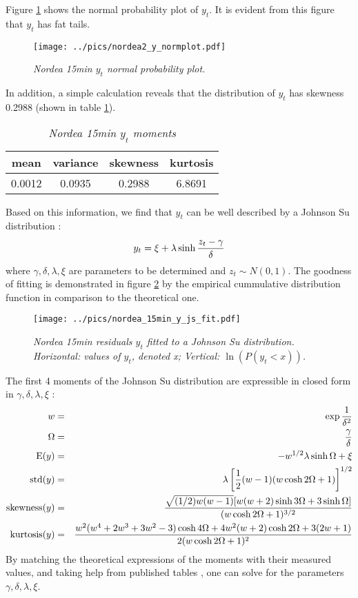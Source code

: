Figure \ref{fig:nordea_15min_y_qq} shows the normal probability plot of
$y_t$. It is evident from this figure that $y_t$ has fat tails.
\begin{figure}[htb!]
  \centering
  \texttt{[image: ../pics/nordea2\_y\_normplot.pdf]}
  \caption{\small \it Nordea 15min $y_t$ normal probability plot.}
  \label{fig:nordea_15min_y_qq}
\end{figure}
In addition, a simple calculation reveals that the distribution of
$y_t$ has skewness 0.2988 (shown in table
\ref{tab:nordea_15min_y_moments}).
\begin{table}[htb!]
  \centering
  \begin{tabular}{|c|c|c|c|}
    \hline
    mean & variance & skewness & kurtosis \\
    \hline
    0.0012 & 0.0935 & 0.2988 & 6.8691 \\
    \hline
  \end{tabular}
  \caption{\small \it Nordea 15min $y_t$ moments}
  \label{tab:nordea_15min_y_moments}
\end{table}
Based on this information, we find that $y_t$ can be well
described by a Johnson Su distribution \cite{Shang2004}:
\[
  y_t = \xi + \lambda\sinh{z_t - \gamma \over \delta}
\]
where $\gamma, \delta, \lambda, \xi$ are parameters to be determined
and $z_t \sim N(0, 1)$. The goodness of fitting is demonstrated in
figure \ref{fig:nordea_15min_y_js_fit} by the
empirical cummulative distribution function in comparison to the
theoretical one.
\begin{figure}[htb!]
  \centering
    \texttt{[image: ../pics/nordea\_15min\_y\_js\_fit.pdf]}
    \caption{\small \it Nordea 15min residuals $y_t$ fitted to a
      Johnson Su distribution. Horizontal: values of $y_t$, denoted x;
      Vertical: $\ln\left(P(y_t < x)\right)$.}
    \label{fig:nordea_15min_y_js_fit}
\end{figure}

The first 4 moments of the Johnson Su distribution are expressible
in closed form in $\gamma, \delta, \lambda, \xi$ \cite{Shang2004}:
\begin{eqnarray*}
  w &=& \exp{1 \over \delta^2} \\
  \Omega &=& {\gamma \over \delta} \\
  \text{E}(y) &=& -w^{1/2} \lambda \sinh\Omega + \xi\\
  \text{std}(y) &=& \lambda \left[{1 \over 2}(w-1)(w\cosh 2\Omega +
    1)\right]^{1/2} \\
  \text{skewness}(y) &=& {
    \sqrt{(1/2)w(w-1)} [w(w+2)\sinh 3\Omega + 3\sinh\Omega]
    \over
    (w\cosh 2\Omega + 1)^{3/2}} \\
  \text{kurtosis}(y) &=& {
    w^2(w^4 + 2w^3 + 3w^2 - 3)\cosh 4\Omega + 4w^2 (w+2) \cosh 2\Omega
    + 3(2w+1) \over
    2(w\cosh 2\Omega + 1)^2 }
\end{eqnarray*}
By matching the theoretical expressions of the moments with their
measured values, and taking help from published tables
\cite{Johnson1965}, one can solve for the parameters $\gamma, \delta,
\lambda, \xi$.

